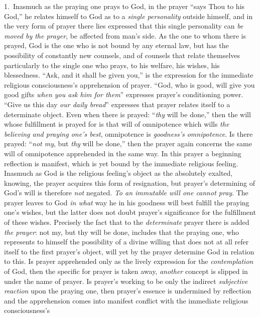 \documentclass[12pt,a4paper]{book}
\begin{document}
1.~Inasmuch as the praying one prays to God, in the prayer ``says Thou to his God,'' he
relates himself to God as to a \emph{single personality} outside himself, and in the very
form of prayer there lies expressed that this single personality can \emph{be moved by the
prayer}, be affected from man's side. As the one to whom there is prayed, God is the one who
is not bound by any eternal law, but has the possibility of constantly new counsels, and of
counsels that relate themselves particularly to the single one who prays, to his welfare,
his wishes, his blessedness. ``Ask, and it shall be given you,'' is the expression for the
immediate religious consciousness's apprehension of prayer. ``God, who is good, will give you
good gifts \emph{when you ask him for them}'' expresses prayer's conditioning power. ``Give
us this day \emph{our daily bread}'' expresses that prayer relates itself to a determinate object.
Even when there is prayed: ``\emph{thy} will be done,'' then the will whose fulfillment is prayed for
is that will of omnipotence which wills \emph{the believing and praying one's best},
omnipotence is \emph{goodness's omnipotence}. Is there prayed: ``\emph{not my}, but \emph{thy} will be done,''
then the prayer again concerns the same will of omnipotence apprehended in the same way. In
this prayer a beginning reflection is manifest, which is yet bound by the immediate religious
feeling. Inasmuch as God is the religious feeling's object as the absolutely exalted,
knowing, the prayer acquires this form of resignation, but prayer's determining of
God's will is therefore \emph{not} negated. \emph{To an immutable will one cannot pray}. The prayer leaves
to God \emph{in what} way he in his goodness will best fulfill the praying one's wishes, but the
latter does not doubt prayer's significance for the fulfillment of these wishes. Precisely
the fact that to the \emph{determinate} prayer there is added \emph{the prayer}: not my, but thy will be
done, includes that the praying one, who represents to himself the possibility of a divine
willing that does not at all refer itself to the first prayer's object, will yet by the prayer
determine God in relation to this. Is prayer apprehended only as the lively expression for
the \emph{contemplation} of God, then the specific for prayer is taken away, \emph{another} concept
is slipped in under the name of prayer. Is prayer's working to be only the indirect
\emph{subjective reaction} upon the praying one, then prayer's essence is undermined by reflection
and the apprehension comes into manifest conflict with the immediate religious consciousness's
\end{document}
